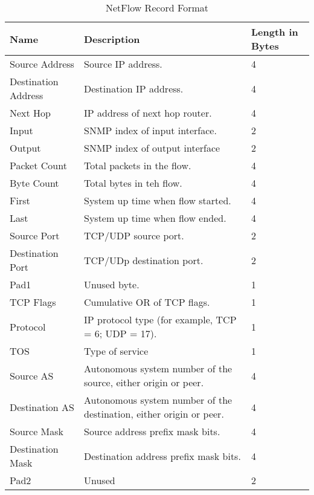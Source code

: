     \begin{table}[ht]
     
     \begin{tabular}{|p{4cm}|p{9cm}|p{2cm}|}
      \hline
      {\bf Name} & {\bf Description} & {\bf Length in Bytes} \\ \hline
      Source Address & Source IP address. & 4 \\ \hline
      Destination Address & Destination IP address. & 4 \\ \hline
      Next Hop & IP address of next hop router. & 4 \\ \hline
      Input & SNMP index of input interface. & 2 \\ \hline
      Output & SNMP index of output interface & 2 \\ \hline
      Packet Count & Total packets in the flow. & 4 \\ \hline
      Byte Count & Total bytes in teh flow. & 4 \\ \hline
      First & System up time when flow started. & 4 \\ \hline
      Last  & System up time when flow ended. & 4 \\ \hline
      Source Port & TCP/UDP source port. & 2 \\ \hline
      Destination Port & TCP/UDp destination port. & 2 \\ \hline
      Pad1 & Unused byte. & 1 \\ \hline
      TCP Flags & Cumulative OR of TCP flags. & 1 \\ \hline
      Protocol &  IP protocol type (for example, TCP = 6; UDP = 17). & 1 \\ \hline
      TOS & Type of service & 1 \\ \hline
      Source AS & Autonomous system number of the source, either origin or peer. & 4 \\ \hline
      Destination AS & Autonomous system number of the destination, either origin or peer. & 4 \\ \hline
      Source Mask & Source address prefix mask bits. & 4 \\ \hline
      Destination Mask & Destination address prefix mask bits. & 4 \\ \hline
      Pad2 & Unused & 2 \\ \hline
      \end{tabular}
     \caption{NetFlow Record Format}
	\label{recordFormat}
    \end{table}

